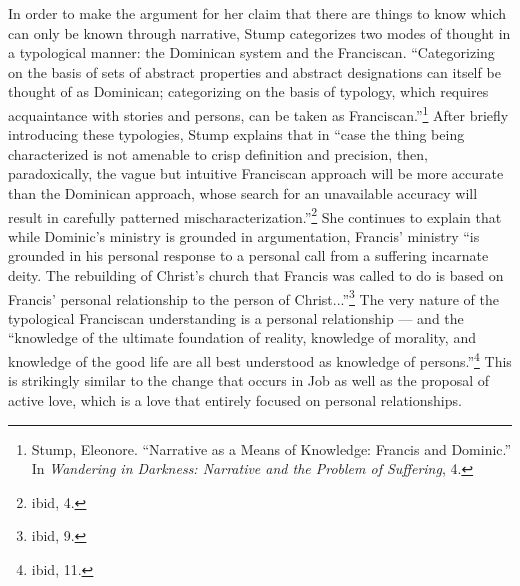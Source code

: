 In order to make the argument for her claim that there are things to know which can only be known through narrative, Stump categorizes two modes of thought in a typological manner: the Dominican system and the Franciscan. ``Categorizing on the basis of sets of abstract properties and abstract designations can itself be thought of as Dominican; categorizing on the basis of typology, which requires acquaintance with stories and persons, can be taken as Franciscan.''\footnote{Stump, Eleonore. ``Narrative as a Means of Knowledge: Francis and Dominic.'' In \emph{Wandering in Darkness: Narrative and the Problem of Suffering}, 4.} After briefly introducing these typologies, Stump explains that in ``case the thing being characterized is not amenable to crisp definition and precision, then, paradoxically, the vague but intuitive Franciscan approach will be more accurate than the Dominican approach, whose search for an unavailable accuracy will result in carefully patterned mischaracterization.''\footnote{ibid, 4.} 
She continues to explain that while Dominic's ministry is grounded in argumentation, Francis' ministry ``is grounded in his personal response to a personal call from a suffering incarnate deity. The rebuilding of Christ's church that Francis was called to do is based on Francis' personal relationship to the person of Christ...''\footnote{ibid, 9.} The very nature of the typological Franciscan understanding is a personal relationship --- and the ``knowledge of the ultimate foundation of reality, knowledge of morality, and knowledge of the good life are all best understood as knowledge of persons.''\footnote{ibid, 11.} This is strikingly similar to the change that occurs in Job as well as the proposal of active love, which is a love that entirely focused on personal relationships.

